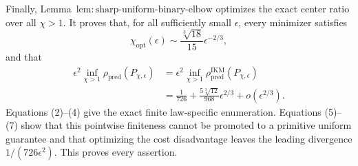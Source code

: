 Finally, Lemma~\(\mathrm{lem{:}sharp\text{-}uniform\text{-}binary\text{-}elbow}\) optimizes the exact center ratio over all \(\chi>1\).  It proves that, for all sufficiently small \(\epsilon\), every minimizer satisfies
\[
 \chi_{\mathrm{opt}}(\epsilon)
 \sim\frac{\sqrt[3]{18}}{15}\epsilon^{-2/3},           \tag{6}
\]
and that
\[
\begin{aligned}
 \epsilon^2\inf_{\chi>1}\rho_{\mathrm{pred}}(P_{\chi,\epsilon})
 &=\epsilon^2\inf_{\chi>1}
   \rho_{\mathrm{pred}}^{\mathrm{IKM}}(P_{\chi,\epsilon})\\
 &=\frac1{726}+\frac{5\sqrt[3]{12}}{968}\epsilon^{2/3}
   +o(\epsilon^{2/3}).                                    \tag{7}
\end{aligned}
\]
Equations (2)--(4) give the exact finite law-specific enumeration.  Equations (5)--(7) show that this pointwise finiteness cannot be promoted to a primitive uniform guarantee and that optimizing the cost disadvantage leaves the leading divergence \(1/(726\epsilon^2)\).  This proves every assertion.